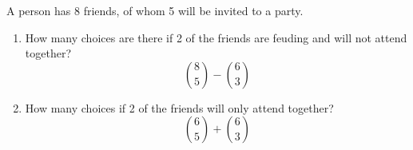 \item A person has 8 friends, of whom 5 will be invited to a party.
\begin{enumerate}
    \item How many choices are there if 2 of the friends are feuding and will not attend together?
    \[ \binom{8}{5} - \binom{6}{3} \]
    \item How many choices if 2 of the friends will only attend together?
    \[ \binom{6}{5} + \binom{6}{3} \]
\end{enumerate}